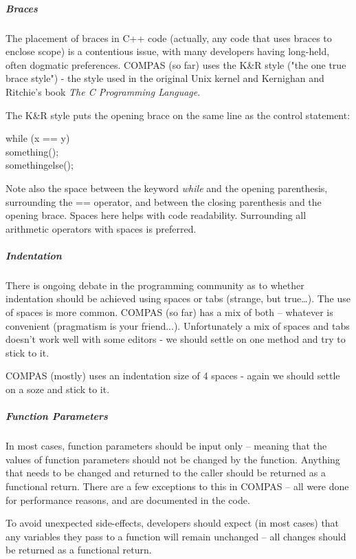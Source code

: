 \subparagraph{Braces}\label{sec:Braces}\mbox{}

\medskip
The placement of braces in C++ code (actually, any code that uses braces to enclose scope) is a contentious issue, with many developers having long-held, often dogmatic preferences.  COMPAS (so far) uses the K\&R style ("the one true brace style") - the style used in the original Unix kernel and Kernighan and Ritchie's book \textit{The C Programming Language}.

The K\&R style puts the opening brace on the same line as the control statement:

\tabto{2em}while (x == y) \lcb \\
\tabto{4em}something(); \\
\tabto{4em}somethingelse(); \\
\rcb

Note also the space between the keyword \textit{while} and the opening parenthesis, surrounding the == operator, and between the closing parenthesis and the opening brace. Spaces here helps with code readability. Surrounding all arithmetic operators with spaces is preferred.

\subparagraph{Indentation}\label{sec:Indentation}\mbox{}

\medskip
There is ongoing debate in the programming community as to whether indentation should be achieved using spaces or tabs (strange, but true{\dots}).  The use of spaces is more common.  COMPAS (so far) has a mix of both -- whatever is convenient (pragmatism is your friend...). Unfortunately a mix of spaces and tabs doesn't work well with some editors - we should settle on one method and try to stick to it.

COMPAS (mostly) uses an indentation size of 4 spaces - again we should settle on a soze and stick to it.

\subparagraph{Function Parameters}\label{sec:FunctionParameters}\mbox{}

\medskip
In most cases, function parameters should be input only -- meaning that the values of function parameters should not be changed by the function. Anything that needs to be changed and returned to the caller should be returned as a functional return. There are a few exceptions to this in COMPAS -- all were done for performance reasons, and are documented in the code.

To avoid unexpected side-effects, developers should expect (in most cases) that any variables they pass to a function will remain unchanged -- all changes should be returned as a functional return.

